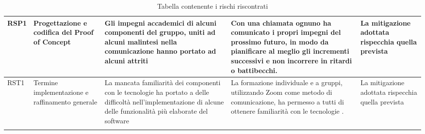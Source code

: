\begin{center}
\begin{longtable}{p{1.5cm}|p{2cm}|p{3.5cm}|p{3.5cm}|p{2.5cm}|}
			\hline
			RSP1 & Progettazione e codifica del Proof of Concept & Gli impegni accademici di alcuni componenti del gruppo, uniti ad alcuni malintesi nella comunicazione hanno portato ad alcuni attriti & Con una chiamata ognuno ha comunicato i propri impegni del prossimo futuro, in modo da pianificare al meglio gli incrementi successivi e non incorrere in ritardi o battibecchi. & La mitigazione adottata rispecchia quella prevista\\
			\hline
			RST1 & Termine implementazione e raffinamento generale & La mancata familiarità dei componenti con le tecnologie ha portato a delle difficoltà nell'implementazione di alcune delle funzionalità più elaborate del software & La formazione individuale e a gruppi, utilizzando Zoom come metodo di comunicazione, ha permesso a tutti di ottenere familiarità con le tecnologie . & La mitigazione adottata rispecchia quella prevista\\
			\rowcolor{white} 
			\caption{Tabella contenente i rischi riscontrati}
	\end{longtable}
\end{center}